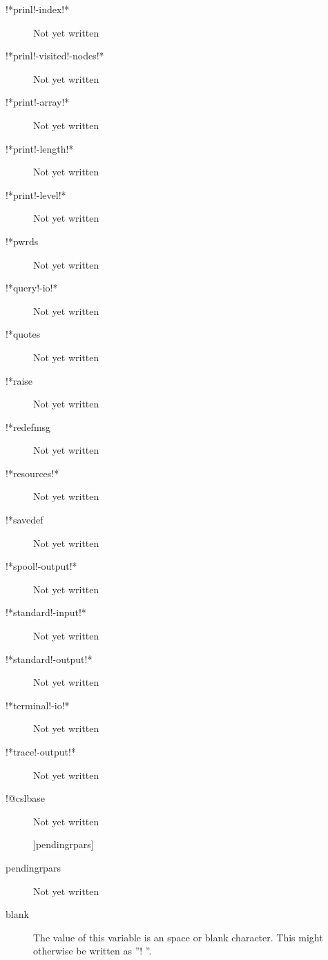 \documentclass[a4paper,11pt]{article}
\begin{document}
\begin{description}
\item [{\ttfamily !*prinl!-index!*}]
Not yet written

\item [{\ttfamily !*prinl!-visited!-nodes!*}]
Not yet written

\item [{\ttfamily !*print!-array!*}]
Not yet written

\item [{\ttfamily !*print!-length!*}]
Not yet written

\item [{\ttfamily !*print!-level!*}]
Not yet written

\item [{\ttfamily !*pwrds}]
Not yet written

\item [{\ttfamily !*query!-io!*}]
Not yet written

\item [{\ttfamily !*quotes}]
Not yet written

\item [{\ttfamily !*raise}]
Not yet written

\item [{\ttfamily !*redefmsg}]
Not yet written

\item [{\ttfamily !*resources!*}]
Not yet written

\item [{\ttfamily !*savedef}]
Not yet written

\item [{\ttfamily !*spool!-output!*}]
Not yet written

\item [{\ttfamily !*standard!-input!*}]
Not yet written

\item [{\ttfamily !*standard!-output!*}]
Not yet written

\item [{\ttfamily !*terminal!-io!*}]
Not yet written

\item [{\ttfamily !*trace!-output!*}]
Not yet written

\item [{\ttfamily !@cslbase}]
Not yet written

]pendingrpars]  \item [{\ttfamily pendingrpars}]
Not yet written

\item [{\ttfamily blank}]
The value of this variable is an space or blank character. This
might otherwise be written as ''{\ttfamily ! }''.


\end{description}
\end{document}
